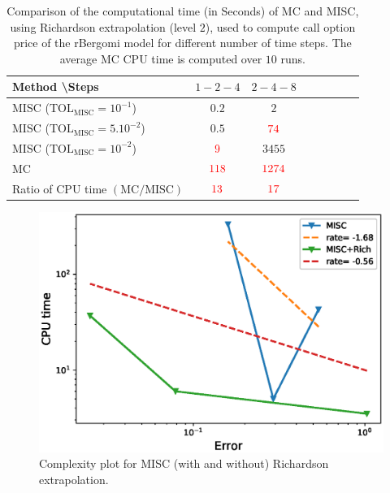\begin{table}[!h]
	\centering
	\begin{tabular}{l*{6}{c}r}
		Method \textbackslash  Steps            & $1-2-4$ & $2-4-8$   \\
		\hline

		MISC ($\text{TOL}_{\text{MISC}}=10^{-1}$)  & $0.2$ & $2$ &   \\
		MISC ($\text{TOL}_{\text{MISC}}=5.10^{-2}$)  & $0.5$ & ${\color{red}74}$  \\
		MISC ($\text{TOL}_{\text{MISC}}=10^{-2}$)  & ${\color{red}9}$ & $3455$   \\
		\hline
		MC    & $ {\color{red}  118}$  & ${\color{red}1274}$  \\
		
		\hline
		Ratio of CPU time $\left(\text{MC}/ \text{MISC} \right)$  &${\color{red}13}$ & ${\color{red}  17}$   \\
		\hline
	\end{tabular}
	\caption{Comparison of the computational time (in Seconds) of  MC and MISC, using Richardson extrapolation (level $2$), used to compute call option price of the rBergomi model for different number of time steps. The
		average MC CPU time is computed over $10$ runs.}
	\label{Comparsion of the computational time of  MC and MISC, using Richardson extrapolation (level $2$), used to compute Call option price of rBergomi model for different number of time steps. Case set $2$ parameters,linear}
\end{table}
\FloatBarrier

\begin{figure}[h!]
	\centering
	\includegraphics[width=0.5\linewidth]{./figures/rBergomi_Complexity_rates/set2/error_vs_time_set2_comparison_linear}
	
	\caption{Complexity plot for  MISC (with and without) Richardson extrapolation.}
	\label{fig:Complexity plot for  MISC for Case set $2$ parameters, comparison}
\end{figure}




